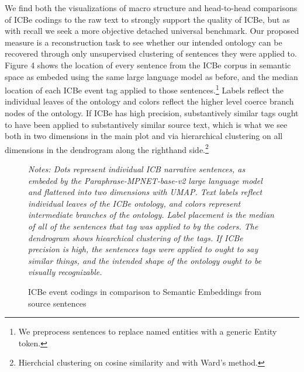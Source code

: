 \documentclass[9pt,twocolumn,twoside,lineno]{pnas-new}
\begin{document}
We find both the visualizations of macro structure and head-to-head
comparisons of ICBe codings to the raw text to strongly support the
quality of ICBe, but as with recall we seek a more objective detached
universal benchmark. Our proposed measure is a reconstruction task to
see whether our intended ontology can be recovered through only
unsupervised clustering of sentences they were applied to. Figure 4
shows the location of every sentence from the ICBe corpus in semantic
space as embeded using the same large language model as before, and the
median location of each ICBe event tag applied to those
sentences.\footnote{We preprocess sentences to replace named entities
  with a generic Entity token.} Labels reflect the individual leaves of
the ontology and colors reflect the higher level coerce branch nodes of
the ontology. If ICBe has high precision, substantively similar tags
ought to have been applied to substantively similar source text, which
is what we see both in two dimensions in the main plot and via
hierarchical clustering on all dimensions in the dendrogram along the
righthand side.\footnote{Hierchcial clustering on cosine similarity and
  with Ward's method.}


\begin{figure}
\caption{ICBe event codings in comparison to Semantic Embeddings from source sentences\label{fig:semantic_embeddings}}
\textit{Notes: Dots represent individual ICB narrative sentences, as embeded by the Paraphrase-MPNET-base-v2 large language model and flattened into two dimensions with UMAP. Text labels reflect individual leaves of the ICBe ontology, and colors represent intermediate branches of the ontology. Label placement is the median of all of the sentences that tag was applied to by the coders. The dendrogram shows hiearchical clustering of the tags. If ICBe precision is high, the sentences tags were applied to ought to say similar things, and the intended shape of the ontology ought to be visually recognizable. }
\end{figure}
\end{document}
